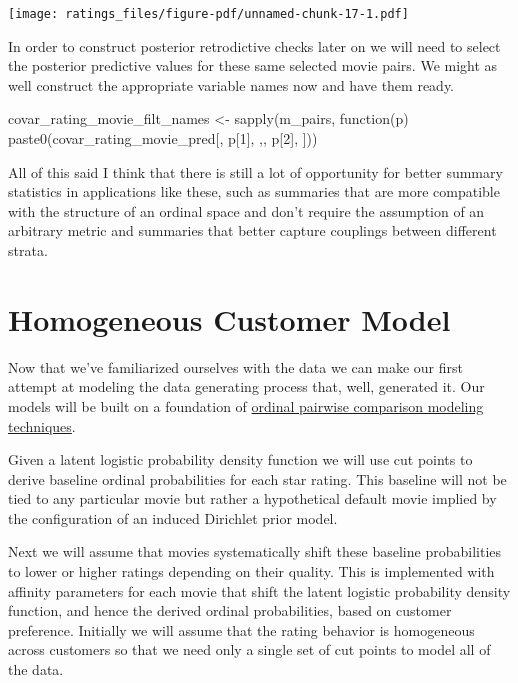 \documentclass[
  letterpaper,
  DIV=11,
  numbers=noendperiod]{scrartcl}
\newenvironment{Shaded}{\begin{snugshade}}{\end{snugshade}}
\newcommand{\ControlFlowTok}[1]{\textcolor[rgb]{0.00,0.23,0.31}{#1}}
\newcommand{\DecValTok}[1]{\textcolor[rgb]{0.68,0.00,0.00}{#1}}
\newcommand{\FunctionTok}[1]{\textcolor[rgb]{0.28,0.35,0.67}{#1}}
\newcommand{\NormalTok}[1]{\textcolor[rgb]{0.00,0.23,0.31}{#1}}
\newcommand{\OtherTok}[1]{\textcolor[rgb]{0.00,0.23,0.31}{#1}}
\newcommand{\StringTok}[1]{\textcolor[rgb]{0.13,0.47,0.30}{#1}}
\begin{document}
\texttt{[image: ratings\_files/figure-pdf/unnamed-chunk-17-1.pdf]}

In order to construct posterior retrodictive checks later on we will
need to select the posterior predictive values for these same selected
movie pairs. We might as well construct the appropriate variable names
now and have them ready.

\begin{Shaded}
\begin{Highlighting}[]
\NormalTok{covar\_rating\_movie\_filt\_names }\OtherTok{\textless{}{-}}
  \FunctionTok{sapply}\NormalTok{(m\_pairs,}
         \ControlFlowTok{function}\NormalTok{(p) }\FunctionTok{paste0}\NormalTok{(}\StringTok{\textquotesingle{}covar\_rating\_movie\_pred[\textquotesingle{}}\NormalTok{,}
\NormalTok{                            p[}\DecValTok{1}\NormalTok{], }\StringTok{\textquotesingle{},\textquotesingle{}}\NormalTok{, p[}\DecValTok{2}\NormalTok{], }\StringTok{\textquotesingle{}]\textquotesingle{}}\NormalTok{))}
\end{Highlighting}
\end{Shaded}

All of this said I think that there is still a lot of opportunity for
better summary statistics in applications like these, such as summaries
that are more compatible with the structure of an ordinal space and
don't require the assumption of an arbitrary metric and summaries that
better capture couplings between different strata.

\section{Homogeneous Customer Model}\label{homogeneous-customer-model}

Now that we've familiarized ourselves with the data we can make our
first attempt at modeling the data generating process that, well,
generated it. Our models will be built on a foundation of
\href{https://betanalpha.github.io/assets/chapters_html/ordinal_modeling.html}{ordinal
pairwise comparison modeling techniques}.

Given a latent logistic probability density function we will use cut
points to derive baseline ordinal probabilities for each star rating.
This baseline will not be tied to any particular movie but rather a
hypothetical default movie implied by the configuration of an induced
Dirichlet prior model.

Next we will assume that movies systematically shift these baseline
probabilities to lower or higher ratings depending on their quality.
This is implemented with affinity parameters for each movie that shift
the latent logistic probability density function, and hence the derived
ordinal probabilities, based on customer preference. Initially we will
assume that the rating behavior is homogeneous across customers so that
we need only a single set of cut points to model all of the data.
\end{document}
